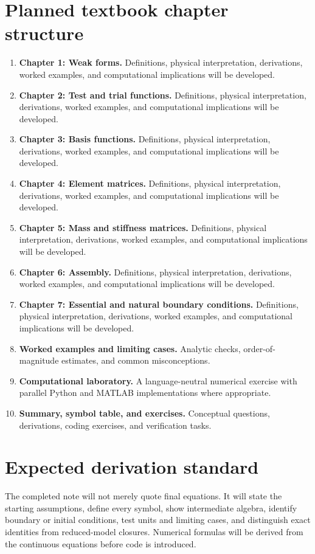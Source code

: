 \documentclass[11pt]{article}
\begin{document}
\section{Planned textbook chapter structure}
\begin{enumerate}[leftmargin=1.8em]
\item \textbf{Chapter 1: Weak forms.} Definitions, physical interpretation, derivations, worked examples, and computational implications will be developed.
\item \textbf{Chapter 2: Test and trial functions.} Definitions, physical interpretation, derivations, worked examples, and computational implications will be developed.
\item \textbf{Chapter 3: Basis functions.} Definitions, physical interpretation, derivations, worked examples, and computational implications will be developed.
\item \textbf{Chapter 4: Element matrices.} Definitions, physical interpretation, derivations, worked examples, and computational implications will be developed.
\item \textbf{Chapter 5: Mass and stiffness matrices.} Definitions, physical interpretation, derivations, worked examples, and computational implications will be developed.
\item \textbf{Chapter 6: Assembly.} Definitions, physical interpretation, derivations, worked examples, and computational implications will be developed.
\item \textbf{Chapter 7: Essential and natural boundary conditions.} Definitions, physical interpretation, derivations, worked examples, and computational implications will be developed.
\item \textbf{Worked examples and limiting cases.} Analytic checks, order-of-magnitude estimates, and common misconceptions.
\item \textbf{Computational laboratory.} A language-neutral numerical exercise with parallel Python and MATLAB implementations where appropriate.
\item \textbf{Summary, symbol table, and exercises.} Conceptual questions, derivations, coding exercises, and verification tasks.
\end{enumerate}

\section{Expected derivation standard}
The completed note will not merely quote final equations. It will state the starting assumptions, define every symbol, show intermediate algebra, identify boundary or initial conditions, test units and limiting cases, and distinguish exact identities from reduced-model closures. Numerical formulas will be derived from the continuous equations before code is introduced.
\end{document}
